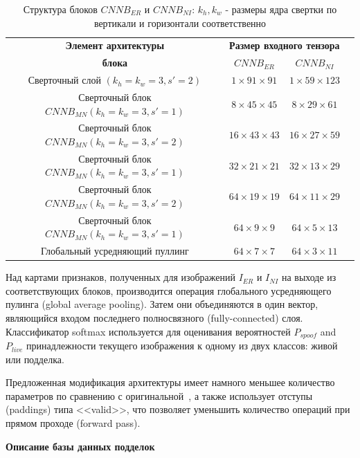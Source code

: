 \begin{table}[h]
	\begin{center}
		\begin{tabular}{|c|c|c|c|}
			\hline
			\textbf{Элемент архитектуры}								& \multicolumn{2}{|c|}{\textbf{Размер входного тензора}} \\
			\cline{2-3}
			\textbf{блока}												& $CNNB_{ER}$				& $CNNB_{NI}$ \\
			\hline
			Сверточный слой $(k_h=k_w=3,s'=2)$							& $1\times91\times91$		& $1\times59\times123$\\
			Сверточный блок $CNNB_{MN} (k_h=k_w=3,s'=1)$ 				& $8\times45\times45$		& $8\times29\times61$\\
			Сверточный блок $CNNB_{MN} (k_h=k_w=3,s'=2)$ 				& $16\times43\times43$		& $16\times27\times59$\\
			Сверточный блок $CNNB_{MN} (k_h=k_w=3,s'=1)$ 				& $32\times21\times21$		& $32\times13\times29$\\
			Сверточный блок $CNNB_{MN} (k_h=k_w=3,s'=2)$ 				& $64\times19\times19$		& $64\times11\times29$\\
			Сверточный блок $CNNB_{MN} (k_h=k_w=3,s'=1)$ 				& $64\times9\times9$		& $64\times5\times13$\\
			Глобальный усредняющий пуллинг								& $64\times7\times7$		& $64\times3\times11$\\
			\hline
		\end{tabular}
	\caption{Структура блоков $CNNB_{ER}$ и $CNNB_{NI}$: $k_h,k_w$ - размеры ядра свертки по вертикали и горизонтали соответственно}
	\label{tab:erniblock}
	\end{center}
\end{table}

Над картами признаков, полученных для изображений $I_{ER}$ и $I_{NI}$ на выходе из соответствующих блоков, производится операция глобального усредняющего пулинга (global average pooling). Затем они объединяются в один вектор, являющийся входом последнего полносвязного (fully-connected) слоя. Классификатор softmax используется для оценивания вероятностей $P_{spoof}$ and $P_{live}$ принадлежности текущего изображения к одному из двух классов: живой или подделка.

Предложенная модификация архитектуры имеет намного меньшее количество параметров по сравнению с оригинальной~\cite{howard_2017}, а также использует отступы (paddings) типа <<valid>>, что позволяет уменьшить количество операций при прямом проходе (forward pass).

{\bf Описание базы данных подделок}
\label{sec:spoof-dataset-description}

